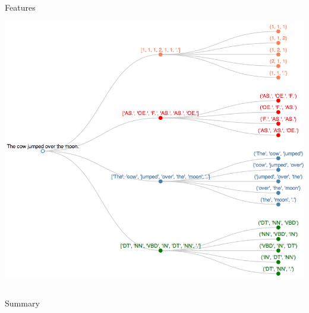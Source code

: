 \documentclass[final]{beamer}
\newlength{\onecolwid}
\newlength{\twocolwid}
\begin{document}
\begin{frame}[t]
\begin{columns}[t]
\begin{column}{\twocolwid}
\begin{columns}[t,totalwidth=\twocolwid]
\begin{column}{\onecolwid}\vspace{-.6in} %


\begin{block}{Features}

\begin{center}
\includegraphics[width=\linewidth]{dendrogram.png}
\end{center}

\end{block}


\end{column} %

\end{columns} %


\begin{alertblock}{Summary}


\end{alertblock}
\end{column}
\end{columns}
\end{frame}
\end{document}

